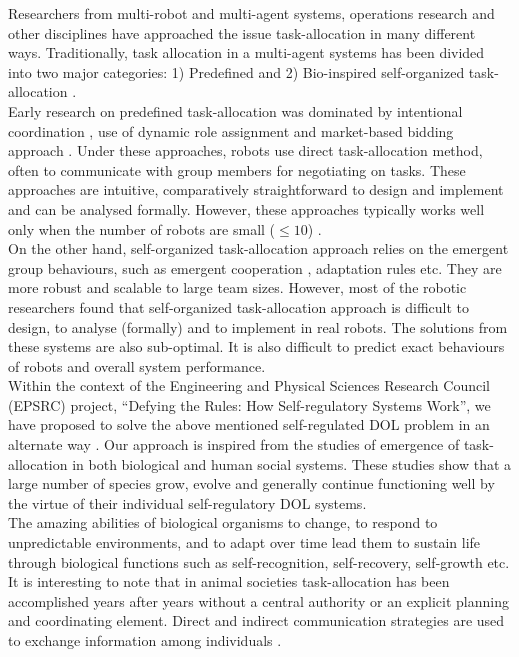Researchers from multi-robot and multi-agent systems, operations research and other disciplines have approached the issue task-allocation in many different ways. Traditionally, task allocation in a multi-agent systems has been divided into two major categories: 1) Predefined and 2) Bio-inspired self-organized task-allocation \cite{Shen+2001}.\\
Early research on predefined task-allocation was dominated by intentional coordination \cite{Parker2008}, use of dynamic role assignment \cite{Chaimowicz2002} and market-based bidding approach \cite{Dias+2006}. Under these approaches, robots use direct task-allocation method, often to communicate with group members for negotiating on tasks. These approaches are intuitive, comparatively straightforward to design and implement and can be analysed formally. However, these approaches typically works well only when the number of robots are small ($\leq 10$) \cite{Lerman+2006}.\\
On the other hand, self-organized task-allocation approach relies on the emergent group behaviours, such as emergent cooperation , adaptation rules  etc. They are more robust and scalable to large team sizes. However, most of the robotic researchers found that self-organized task-allocation approach is difficult to design, to analyse (formally) and to implement in real robots. The solutions from these systems are also sub-optimal. It is also difficult to predict exact behaviours of robots and overall system performance.\\
Within the context of the Engineering and Physical Sciences Research Council (EPSRC) project, ``Defying the Rules: How Self-regulatory Systems Work'', we have proposed to solve the above mentioned self-regulated DOL problem in an alternate way \cite{Arcaute+2008}. Our approach is inspired from the studies of emergence of task-allocation in both biological and human social systems. These studies show that a large number of species grow, evolve and generally continue functioning well by the virtue of their individual self-regulatory DOL systems.\\
The amazing abilities of biological organisms to change, to respond to unpredictable environments, and to adapt over time lead them to sustain life through biological functions such as self-recognition, self-recovery, self-growth etc. It is interesting to note that in animal societies task-allocation has been accomplished years after years without a central authority or an explicit planning and coordinating element. Direct and indirect communication strategies are used to exchange information among individuals \cite{Camazine+2001}.\\
